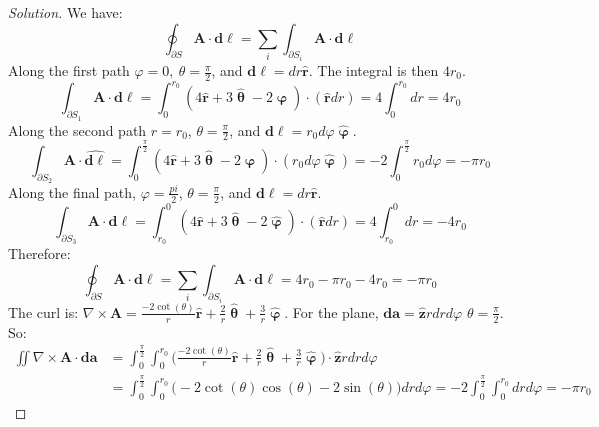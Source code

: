 \documentclass{article}
\theoremstyle{mystyle}
\begin{document}
\begin{proof}[Solution]
We have:
\begin{equation*}
    \oint_{\partial S}\mathbf{A}\cdot \boldsymbol{d\ell} = \sum_{i} \int_{\partial S_{i}} \mathbf{A}\cdot \boldsymbol{d\ell}
\end{equation*}
Along the first path $\varphi=0,\ \theta = \frac{\pi}{2}$, and $\boldsymbol{d\ell} = dr\hat{\mathbf{r}}$. The integral is then $4r_0$.
\begin{equation*}
    \int_{\partial S_{1}}\mathbf{A}\cdot\boldsymbol{d\ell}=\int_{0}^{r_{0}}(4\hat{\mathbf{r}}+3\hat{\boldsymbol{\uptheta}}-2\hat{\boldsymbol{\upvarphi}})\cdot (\hat{\mathbf{r}}dr)=4\int_{0}^{r_{0}}dr=4r_{0}
\end{equation*}
Along the second path $r=r_0$, $\theta = \frac{\pi}{2}$, and $\boldsymbol{d\ell} = r_0 d\varphi \hat{\boldsymbol{\upvarphi}}$.
\begin{equation*}
    \int_{\partial S_{2}}\mathbf{A}\cdot \hat{\boldsymbol{d\ell}}=\int_{0}^{\frac{\pi}{2}}(4\hat{\mathbf{r}}+3\hat{\boldsymbol{\uptheta}}-2\hat{\boldsymbol{\upvarphi}})\cdot(r_{0}d\varphi\hat{\boldsymbol{\upvarphi}})=-2\int_{0}^{\frac{\pi}{2}}r_{0}d\varphi=-\pi r_{0}
\end{equation*}
Along the final path, $\varphi = \frac{pi}{2}$, $\theta = \frac{\pi}{2}$, and $ \boldsymbol{d\ell} = dr \hat{\mathbf{r}}$.
\begin{equation*}
    \int_{\partial S_{3}}\mathbf{A}\cdot \boldsymbol{d\ell}=\int_{r_{0}}^{0}(4\hat{\mathbf{r}}+3\hat{\boldsymbol{\uptheta}}-2\hat{\boldsymbol{\upvarphi}})\cdot (\hat{\mathbf{r}}dr)=4\int_{r_{0}}^{0}dr=-4r_{0}
\end{equation*}
Therefore:
\begin{equation*}
    \oint_{\partial S}\mathbf{A}\cdot\boldsymbol{d\ell}=\sum_{i}\int_{\partial S_{i}}\mathbf{A}\cdot\boldsymbol{d\ell}=4r_{0}-\pi r_{0}-4r_{0}=-\pi r_{0}
\end{equation*}
The curl is: $\nabla\times\mathbf{A}=\frac{-2\cot(\theta)}{r}\hat{\mathbf{r}}+\frac{2}{r}\hat{\boldsymbol{\uptheta}}+\frac{3}{r}\hat{\boldsymbol{\upvarphi}}$. For the plane, $\boldsymbol{da}=\hat{\mathbf{z}}rdrd\varphi$ $\theta=\frac{\pi}{2}$. So:
\begin{align*}
    \iint \nabla \times \mathbf{A} \cdot \boldsymbol{da} &= \int_{0}^{\frac{\pi}{2}}\int_{0}^{r_{0}} \bigg(\frac{-2\cot(\theta)}{r}\hat{\mathbf{r}}+\frac{2}{r}\hat{\boldsymbol{\uptheta}}+\frac{3}{r}\hat{\boldsymbol{\upvarphi}}\bigg)\cdot \hat{\mathbf{z}} rdrd\varphi\\
    &= \int_{0}^{\frac{\pi}{2}}\int_{0}^{r_{0}}\bigg(-2\cot(\theta)\cos(\theta)-2\sin(\theta)\bigg)drd\varphi= -2\int_{0}^{\frac{\pi}{2}}\int_{0}^{r_{0}}drd\varphi=-\pi r_{0}
\end{align*}
\end{proof}
\end{document}
